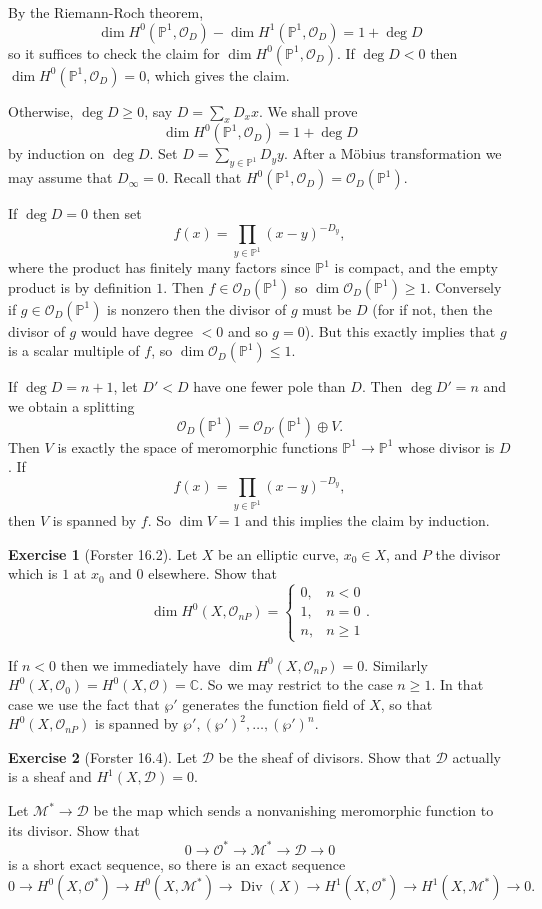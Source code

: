 \documentclass[10pt]{article}
\newcommand{\CC}{\mathbb{C}}
\newcommand{\PP}{\mathbb P}
\newcommand{\Div}{\operatorname{Div}}
\newcommand{\Mero}{\mathscr M}
\newcommand{\Olo}{\mathscr O}
\theoremstyle{definition}
\newtheorem{exer}{Exercise}
\begin{document}
By the Riemann-Roch theorem,
$$\dim H^0(\PP^1, \Olo_D) - \dim H^1(\PP^1, \Olo_D) = 1 + \deg D$$
so it suffices to check the claim for $\dim H^0(\PP^1, \Olo_D)$.
If $\deg D < 0$ then $\dim H^0(\PP^1, \Olo_D) = 0$, which gives the claim.

Otherwise, $\deg D \geq 0$, say $D = \sum_x D_x x$. We shall prove
$$\dim H^0(\PP^1, \Olo_D) = 1 + \deg D$$
by induction on $\deg D$. Set $D = \sum_{y \in \PP^1} D_y y$.
After a M\"obius transformation we may assume that $D_\infty = 0$.
Recall that $H^0(\PP^1, \Olo_D) = \Olo_D(\PP^1)$.

If $\deg D = 0$ then set
$$f(x) = \prod_{y \in \PP^1} (x - y)^{-D_y},$$
where the product has finitely many factors since $\PP^1$ is compact, and the empty product is by definition $1$.
Then $f \in \Olo_D(\PP^1)$ so $\dim \Olo_D(\PP^1) \geq 1$.
Conversely if $g \in \Olo_D(\PP^1)$ is nonzero then the divisor of $g$ must be $D$ (for if not, then the divisor of $g$ would have degree $<0$ and so $g = 0$).
But this exactly implies that $g$ is a scalar multiple of $f$, so $\dim \Olo_D(\PP^1) \leq 1$.

If $\deg D = n + 1$, let $D' < D$ have one fewer pole than $D$.
Then $\deg D' = n$ and we obtain a splitting
$$\Olo_D(\PP^1) = \Olo_{D'}(\PP^1) \oplus V.$$
Then $V$ is exactly the space of meromorphic functions $\PP^1 \to \PP^1$ whose divisor is $D$.
If
$$f(x) = \prod_{y \in \PP^1} (x - y)^{-D_y},$$
then $V$ is spanned by $f$. So $\dim V = 1$ and this implies the claim by induction.


\begin{exer}[Forster 16.2]
Let $X$ be an elliptic curve, $x_0 \in X$, and $P$ the divisor which is $1$ at $x_0$ and $0$ elsewhere. Show that
$$\dim H^0(X, \Olo_{nP}) = \begin{cases}0, &n < 0\\
1, &n = 0\\
n, &n \geq 1
\end{cases}.$$
\end{exer}

If $n < 0$ then we immediately have $\dim H^0(X, \Olo_{nP}) = 0$.
Similarly $H^0(X, \Olo_0) = H^0(X, \Olo) = \CC$.
So we may restrict to the case $n \geq 1$.
In that case we use the fact that $\wp'$ generates the function field of $X$, so that $H^0(X, \Olo_{nP})$ is spanned by $\wp', (\wp')^2, \dots, (\wp')^n$.

\begin{exer}[Forster 16.4]
Let $\mathscr D$ be the sheaf of divisors. Show that $\mathscr D$ actually is a sheaf and $H^1(X, \mathscr D) = 0$.

Let $\Mero^* \to \mathscr D$ be the map which sends a nonvanishing meromorphic function to its divisor. Show that
$$0 \to \Olo^* \to \Mero^* \to \mathscr D \to 0$$
is a short exact sequence, so there is an exact sequence
$$0 \to H^0(X, \Olo^*) \to H^0(X, \Mero^*) \to \Div(X) \to H^1(X, \Olo^*) \to H^1(X, \Mero^*) \to 0.$$
\end{exer}
\end{document}
